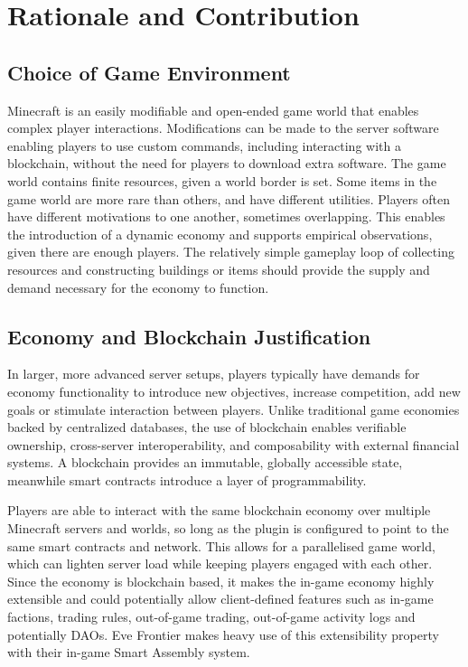 \documentclass[conference]{IEEEtran}
\begin{document}
\section{Rationale and Contribution}

\subsection{Choice of Game Environment} 
Minecraft is an easily modifiable and open-ended game world that enables complex player interactions. Modifications can be made to the server software enabling players to use custom commands, including interacting with a blockchain, without the need for players to download extra software. The game world contains finite resources, given a world border is set. Some items in the game world are more rare than others, and have different utilities. Players often have different motivations to one another, sometimes overlapping. This enables the introduction of a dynamic economy and supports empirical observations, given there are enough players\cite{butler2024minecraft}. The relatively simple gameplay loop of collecting resources and constructing buildings or items should provide the supply and demand necessary for the economy to function. 

\subsection{Economy and Blockchain Justification}
In larger, more advanced server setups, players typically have demands for economy functionality to introduce new objectives, increase competition, add new goals or stimulate interaction between players. Unlike traditional game economies backed by centralized databases, the use of blockchain enables verifiable ownership, cross-server interoperability, and composability with external financial systems. A blockchain provides an immutable, globally accessible state, meanwhile smart contracts introduce a layer of programmability\cite{ethereumevm}. 

Players are able to interact with the same blockchain economy over multiple Minecraft servers and worlds, so long as the plugin is configured to point to the same smart contracts and network. This allows for a parallelised game world, which can lighten server load while keeping players engaged with each other. Since the economy is blockchain based, it makes the in-game economy highly extensible and could potentially allow client-defined features such as in-game factions, trading rules, out-of-game trading, out-of-game activity logs and potentially DAOs. Eve Frontier makes heavy use of this extensibility property with their in-game Smart Assembly system\cite{evefrontiercontracts}. 
\end{document}
